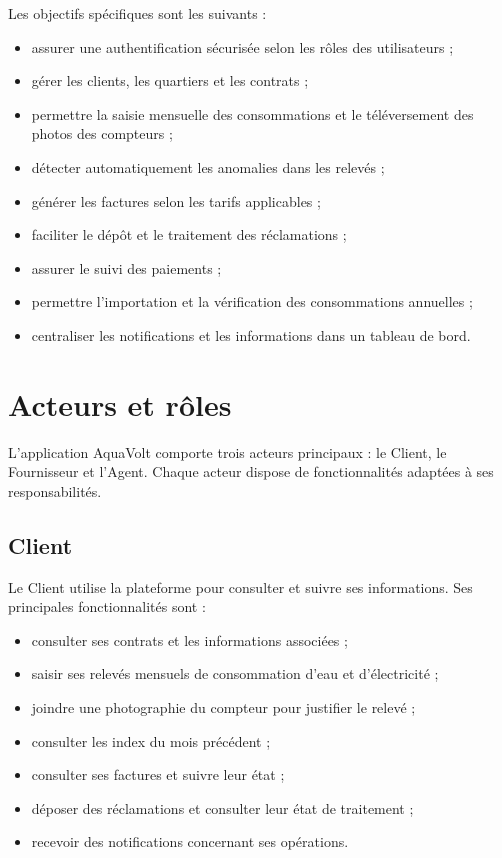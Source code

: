 Les objectifs spécifiques sont les suivants :

\begin{itemize}[leftmargin=*]
    \item assurer une authentification sécurisée selon les rôles des utilisateurs ;
    \item gérer les clients, les quartiers et les contrats ;
    \item permettre la saisie mensuelle des consommations et le téléversement des photos des compteurs ;
    \item détecter automatiquement les anomalies dans les relevés ;
    \item générer les factures selon les tarifs applicables ;
    \item faciliter le dépôt et le traitement des réclamations ;
    \item assurer le suivi des paiements ;
    \item permettre l'importation et la vérification des consommations annuelles ;
    \item centraliser les notifications et les informations dans un tableau de bord.
\end{itemize}

\section{Acteurs et rôles}

L'application AquaVolt comporte trois acteurs principaux : le Client, le Fournisseur et l'Agent. Chaque acteur dispose de fonctionnalités adaptées à ses responsabilités.

\subsection{Client}

Le Client utilise la plateforme pour consulter et suivre ses informations. Ses principales fonctionnalités sont :

\begin{itemize}[leftmargin=*]
    \item consulter ses contrats et les informations associées ;
    \item saisir ses relevés mensuels de consommation d'eau et d'électricité ;
    \item joindre une photographie du compteur pour justifier le relevé ;
    \item consulter les index du mois précédent ;
    \item consulter ses factures et suivre leur état ;
    \item déposer des réclamations et consulter leur état de traitement ;
    \item recevoir des notifications concernant ses opérations.
\end{itemize}

